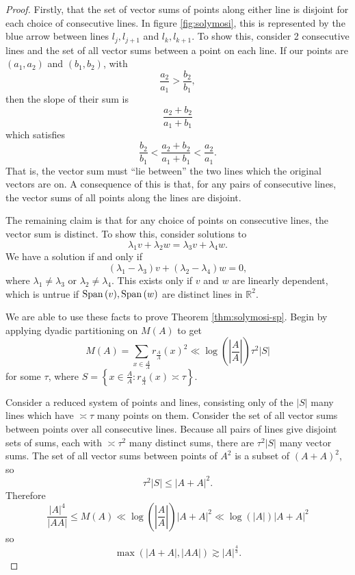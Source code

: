 \documentclass[12pt,reqno]{amsart}
\begin{document}
\begin{proof}
Firstly, that the set of vector sums of points along either line is disjoint for each
choice of consecutive lines. In figure \ref{fig:solymosi}, this is represented by the blue arrow between lines
\(l _{j} , l _{j + 1} \) and \(l _{k}  , l _{k+1} \).
To show this, consider 2 consecutive lines and the set of all vector sums between a point on each line.
If our points are \(\left( a_1,a_2 \right)\) and \(\left( b_1,b_2 \right) \), with
\[
    \frac{a_2}{a_1} > \frac{b_2}{b_1}
,\]
then the slope of their sum is
\[
    \frac{a_2+b_2}{a_1+b_1}
\]
which satisfies
\[
    \frac{b_2}{b_1} < \frac{a_2+b_2}{a_1+b_1} < \frac{a_2}{a_1}
.\]
That is, the vector sum must ``lie between'' the two lines which the original vectors are on.
A consequence of this is that, for any pairs of consecutive lines, 
the vector sums of all points along the lines are disjoint.

The remaining claim is that for any choice of points on consecutive lines, the vector sum is distinct.
To show this, consider solutions to
\[
    \lambda_1 v + \lambda_2 w = \lambda_3 v + \lambda_4 w
.\]
We have a solution if and only if
\[
    \left( \lambda_1 - \lambda_3 \right) v + \left( \lambda_2 - \lambda_4 \right) w = 0 
,\]
where \(\lambda_1 \neq \lambda_3\) or \(\lambda_2 \neq \lambda_4\).
This exists only if \(v\) and \(w\) are linearly dependent, which is untrue if
\(\operatorname{Span}{ \left( v \right) } , \operatorname{Span}{ \left( w \right) } \) are distinct lines in \(\mathbb{R} ^{2}\).

We are able to use these facts to prove Theorem \ref{thm:solymosi-sp}.
Begin by applying dyadic partitioning on \(M(A)\) to get
\[
    M(A) = \sum _{x \in \frac{A}{A} } r_{\frac{A}{A} } (x)^{2} \ll  \log \left( \left\lvert \frac{A}{A} \right\rvert   \right) \tau ^{2} \left\lvert S \right\rvert
\]
for some \(\tau\), where \(S = \left\{ x \in \frac{A}{A}  : r_{\frac{A}{A} } (x) \asymp \tau \right\} \).

Consider a reduced system of points and lines, consisting only of the \(\left\lvert S \right\rvert \) many lines which
have \(\asymp \tau\) many points on them. Consider the set of all vector sums between points over
all consecutive lines. Because all pairs of lines give disjoint sets of sums, each with \(\asymp \tau ^{2}\) many distinct sums, there are
\(\tau^{2}\left\lvert S \right\rvert \) many vector sums. The set of all vector sums between points of \(A^{2}\) is a subset of \((A+A)^{2}\),
so
\[
    \tau^{2} \left\lvert S \right\rvert \leq \left\lvert A+A \right\rvert  ^{2}
.\]
Therefore
\[
    \frac{\left\lvert A \right\rvert ^{4}}{\left\lvert AA\right\rvert } \leq M(A) \ll \log \left( \left\lvert \frac{A}{A} \right\rvert   \right) \left\lvert A + A \right\rvert ^{2} \ll \log \left( \left\lvert A \right\rvert  \right)  \left\lvert A+A \right\rvert  ^{2}
\]
so
\[
    \max \left( \left\lvert A + A \right\rvert , \left\lvert AA \right\rvert  \right) \gtrsim \left\lvert A \right\rvert ^{\frac{4}{3} }
.\]

\end{proof}
\end{document}
